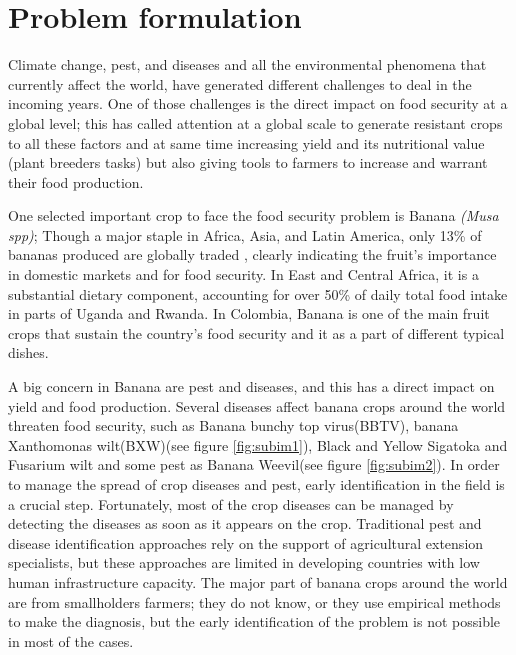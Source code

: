 \usepackage{caption}
\usepackage{subcaption}

\chapter{Problem formulation} %
\label{Chapter2}

Climate change, pest, and diseases and all the environmental phenomena that currently affect the world, have generated different challenges to deal in the incoming years. One of those challenges is the direct impact on food security \cite{wheeler2013climate} at a global level; this has called attention at a global scale to generate  resistant crops to all these factors and at same time increasing yield and its nutritional value (plant breeders tasks) but also giving tools to farmers to increase and warrant their food production.

One selected important crop to face the food security problem is Banana \textit{(Musa spp)}\cite{faostat2014food};
Though a major staple in Africa, Asia, and Latin America, only 13\% of bananas produced are globally traded \cite{lescot2013world}, clearly indicating the fruit’s importance in domestic markets and for food security. In East and Central Africa, it is a substantial dietary component, accounting for over 50\% of daily total food intake in parts of Uganda and Rwanda\cite{abele2007bacterial}. In Colombia, Banana is one of the main fruit crops that sustain the country's food security and it as a part of different typical dishes.

A big concern in Banana are pest and diseases, and this has a direct impact on yield and food production. Several diseases affect banana crops around the world threaten food security, such as Banana bunchy top virus(BBTV), banana Xanthomonas wilt(BXW)(see figure \ref{fig:subim1}), Black and Yellow Sigatoka and Fusarium wilt and some pest as Banana Weevil(see figure \ref{fig:subim2}). In order to manage the spread of crop diseases and pest, early identification in the field is a crucial step. Fortunately, most of the crop diseases can be managed by detecting the diseases as soon as it appears on the crop. Traditional pest and disease identification approaches rely on the support of agricultural extension specialists, but these approaches are limited in developing countries with low human infrastructure capacity. The major part of banana crops around the world are from smallholders farmers; they do not know, or they use empirical methods to make the diagnosis, but the early identification of the problem is not possible in most of the cases. 


